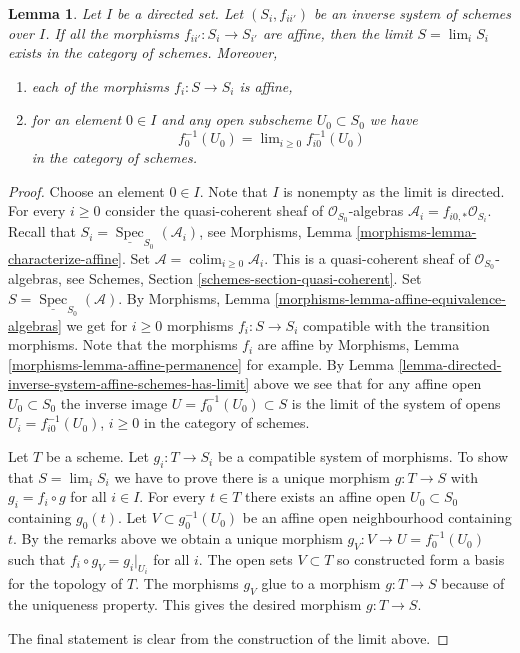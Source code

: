 \documentclass{stacks-project}
\theoremstyle{plain}
\newtheorem{lemma}[subsection]{Lemma}
\theoremstyle{definition}
\theoremstyle{remark}
\numberwithin{equation}{subsection}
\def\lim{\mathop{\mathrm{lim}}\nolimits}
\def\colim{\mathop{\mathrm{colim}}\nolimits}
\def\Spec{\mathop{\mathrm{Spec}}}
\begin{document}
\begin{lemma}
\label{lemma-directed-inverse-system-has-limit}
Let $I$ be a directed set. Let $(S_i, f_{ii'})$ be an
inverse system of schemes over $I$. If all the morphisms
$f_{ii'} : S_i \to S_{i'}$ are affine, then the limit $S = \lim_i S_i$ exists
in the category of schemes. Moreover,
\begin{enumerate}
\item each of the morphisms $f_i : S \to S_i$ is affine,
\item for an element $0 \in I$ and any open subscheme $U_0 \subset S_0$
we have
$$
f_0^{-1}(U_0) = \lim_{i \geq 0} f_{i0}^{-1}(U_0)
$$
in the category of schemes.
\end{enumerate}
\end{lemma}

\begin{proof}
Choose an element $0 \in I$. Note that $I$ is nonempty as the limit is
directed. For every $i \geq 0$ consider the quasi-coherent sheaf of
$\mathcal{O}_{S_0}$-algebras $\mathcal{A}_i = f_{i0, *}\mathcal{O}_{S_i}$.
Recall that $S_i = \underline{\Spec}_{S_0}(\mathcal{A}_i)$,
see Morphisms, Lemma \ref{morphisms-lemma-characterize-affine}.
Set $\mathcal{A} = \colim_{i \geq 0} \mathcal{A}_i$.
This is a quasi-coherent sheaf of $\mathcal{O}_{S_0}$-algebras,
see Schemes, Section \ref{schemes-section-quasi-coherent}.
Set $S = \underline{\Spec}_{S_0}(\mathcal{A})$.
By Morphisms, Lemma \ref{morphisms-lemma-affine-equivalence-algebras}
we get for $i \geq 0$ morphisms $f_i : S \to S_i$ compatible with
the transition morphisms. Note that the morphisms $f_i$ are
affine by Morphisms, Lemma \ref{morphisms-lemma-affine-permanence} for example.
By Lemma \ref{lemma-directed-inverse-system-affine-schemes-has-limit} above
we see that for any affine open $U_0 \subset S_0$ the
inverse image $U = f_0^{-1}(U_0) \subset S$ is the limit of the
system of opens $U_i = f_{i0}^{-1}(U_0)$, $i \geq 0$ in the
category of schemes.

\medskip\noindent
Let $T$ be a scheme. Let $g_i : T \to S_i$ be a compatible system
of morphisms. To show that $S = \lim_i S_i$ we have
to prove there is a unique morphism $g : T \to S$ with
$g_i = f_i \circ g$ for all $i \in I$.
For every $t \in T$ there exists an affine open
$U_0 \subset S_0$ containing $g_0(t)$. Let $V \subset g_0^{-1}(U_0)$
be an affine open neighbourhood containing $t$.
By the remarks above we obtain a unique morphism
$g_V : V \to U = f_0^{-1}(U_0)$ such that $f_i \circ g_V = g_i|_{U_i}$
for all $i$. The open sets $V \subset T$ so constructed form
a basis for the topology of $T$. The morphisms $g_V$ glue to a morphism
$g : T \to S$ because of the uniqueness property. This gives the
desired morphism $g : T \to S$.

\medskip\noindent
The final statement is clear from the construction of the limit above.
\end{proof}
\end{document}
